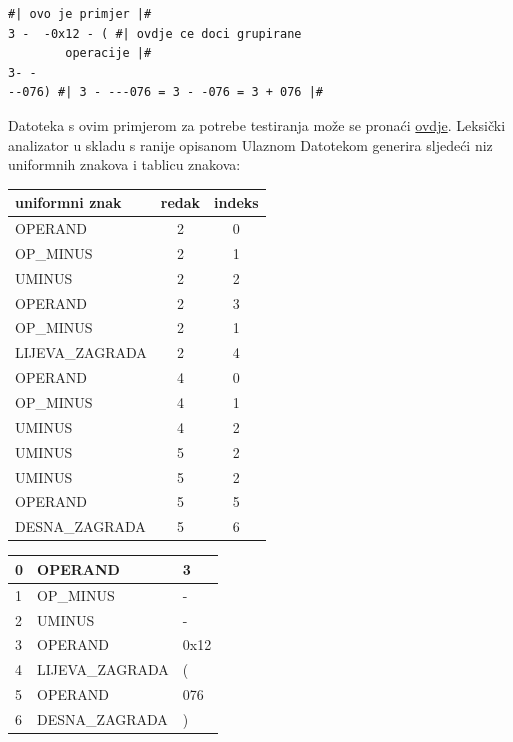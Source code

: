 \documentclass[times, 12pt, utf8]{book}
\begin{document}
\begin{lstlisting}[caption={Primjer programa pisanog u jeziku \emph{minusLang}.},label=lst:minusLang_primjer_ponovljen]
#| ovo je primjer |#
3 -  -0x12 - ( #| ovdje ce doci grupirane
		operacije |#
3- -
--076) #| 3 - ---076 = 3 - -076 = 3 + 076 |#

\end{lstlisting}

Datoteka s ovim primjerom za potrebe testiranja može se pronaći \href{https://github.com/fer-ppj/ppj-labosi/raw/master/res/lab1/primjer.minus}{ovdje}.
Leksički analizator u skladu s ranije opisanom Ulaznom Datotekom generira sljedeći niz uniformnih znakova i tablicu znakova:

\begin{table}[ht]
\begin{minipage}[b]{0.5\linewidth}
\centering
\begin{tabular}{|l|c|c|}
\hline
uniformni znak&redak&indeks\\
\hline
OPERAND&2&0\\
\hline
OP\_MINUS&2&1\\
\hline
UMINUS&2&2\\
\hline
OPERAND&2&3\\
\hline
OP\_MINUS&2&1\\
\hline
LIJEVA\_ZAGRADA&2&4\\
\hline
OPERAND&4&0\\
\hline
OP\_MINUS&4&1\\
\hline
UMINUS&4&2\\
\hline
UMINUS&5&2\\
\hline
UMINUS&5&2\\
\hline
OPERAND&5&5\\
\hline
DESNA\_ZAGRADA&5&6\\
\hline
\end{tabular}
\end{minipage}
\hspace{0.5cm}
\begin{minipage}[b]{0.5\linewidth}
\centering
\begin{tabular}{|l|l|l|}
\hline
0&OPERAND&3\\
\hline
1&OP\_MINUS&-\\
\hline
2&UMINUS&-\\
\hline
3&OPERAND&0x12\\
\hline
4&LIJEVA\_ZAGRADA&(\\
\hline
5&OPERAND&076\\
\hline
6&DESNA\_ZAGRADA&)\\
\hline
\end{tabular}
\end{minipage}
\end{table}
\end{document}
